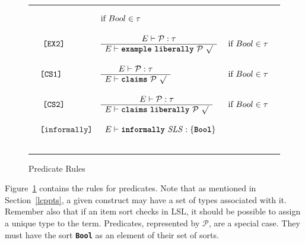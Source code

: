 \documentclass[12pt]{article} %
\newcommand{\reserved}[1]{\textbf{\texttt{#1}}} %
\newcommand{\RULELAB}[1]{\texttt{#1}}
\newcommand{\UNSPACEFORBOX}{\vspace{-2ex}}
\newcommand{\HLINE}{\UNSPACEFORBOX%
\begin{flushleft}\rule{\textwidth}{0.01in}\end{flushleft}%
\UNSPACEFORBOX}
\newenvironment{BFIGURE}{

\begin{figure}
\small
\HLINE
}{
\HLINE
\normalsize
\end{figure}
}
\begin{document}
\begin{BFIGURE}
\begin{displaymath}
\begin{array}{llc}
&
\mbox{if $Bool \in \tau$}
\\
~\\\
\RULELAB{[EX2]} &
\begin{array}{c}
E \vdash \mathcal{P}: \tau\\
\hline
E \vdash \mbox{\reserved{example} \reserved{liberally} }\mathcal{P}~ \surd
\end{array}
&
\mbox{if $Bool \in \tau$}
\\
~\\
\RULELAB{[CS1]} &
\begin{array}{c}
E \vdash \mathcal{P}: \tau\\
\hline
E \vdash \mbox{\reserved{claims} }\mathcal{P}~ \surd
\end{array}
&
\mbox{if $Bool \in \tau$}
\\
~\\\
\RULELAB{[CS2]} &
\begin{array}{c}
E \vdash \mathcal{P}: \tau\\
\hline
E \vdash \mbox{\reserved{claims} \reserved{liberally} }\mathcal{P}~ \surd
\end{array}
&
\mbox{if $Bool \in \tau$}
\\
~\\
\RULELAB{[informally]} &
\begin{array}{c}
E \vdash \mbox{\reserved{informally} \textit{SLS}} : \{\reserved{Bool}\}
\end{array}
\\
~\\
\end{array}
\end{displaymath}
\caption{Predicate Rules}
\label{fig-two}
\end{BFIGURE}
Figure~\ref{fig-two} contains the rules for predicates. Note that as
mentioned in Section~\ref{lcppts}, a given construct may have a set of
types associated with it. Remember also that if an item sort checks in
LSL, it should be possible to assign a unique type to the
term. Predicates, represented by $\mathcal{P}$, are a special
case. They must have the sort \reserved{Bool} as an element of their
set of sorts.
\end{document}
